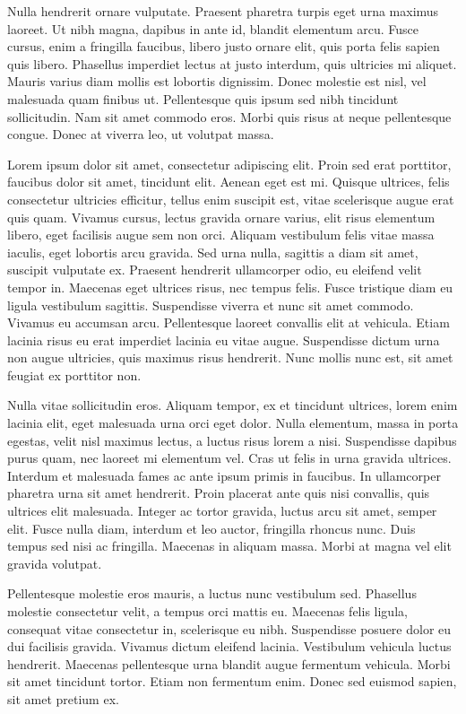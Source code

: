 Nulla hendrerit ornare vulputate. Praesent pharetra turpis eget urna maximus laoreet. Ut nibh magna, dapibus in ante id, blandit elementum arcu. Fusce cursus, enim a fringilla faucibus, libero justo ornare elit, quis porta felis sapien quis libero. Phasellus imperdiet lectus at justo interdum, quis ultricies mi aliquet. Mauris varius diam mollis est lobortis dignissim. Donec molestie est nisl, vel malesuada quam finibus ut. Pellentesque quis ipsum sed nibh tincidunt sollicitudin. Nam sit amet commodo eros. Morbi quis risus at neque pellentesque congue. Donec at viverra leo, ut volutpat massa. 




Lorem ipsum dolor sit amet, consectetur adipiscing elit. Proin sed erat porttitor, faucibus dolor sit amet, tincidunt elit. Aenean eget est mi. Quisque ultrices, felis consectetur ultricies efficitur, tellus enim suscipit est, vitae scelerisque augue erat quis quam. Vivamus cursus, lectus gravida ornare varius, elit risus elementum libero, eget facilisis augue sem non orci. Aliquam vestibulum felis vitae massa iaculis, eget lobortis arcu gravida. Sed urna nulla, sagittis a diam sit amet, suscipit vulputate ex. Praesent hendrerit ullamcorper odio, eu eleifend velit tempor in. Maecenas eget ultrices risus, nec tempus felis. Fusce tristique diam eu ligula vestibulum sagittis. Suspendisse viverra et nunc sit amet commodo. Vivamus eu accumsan arcu. Pellentesque laoreet convallis elit at vehicula. Etiam lacinia risus eu erat imperdiet lacinia eu vitae augue. Suspendisse dictum urna non augue ultricies, quis maximus risus hendrerit. Nunc mollis nunc est, sit amet feugiat ex porttitor non.

Nulla vitae sollicitudin eros. Aliquam tempor, ex et tincidunt ultrices, lorem enim lacinia elit, eget malesuada urna orci eget dolor. Nulla elementum, massa in porta egestas, velit nisl maximus lectus, a luctus risus lorem a nisi. Suspendisse dapibus purus quam, nec laoreet mi elementum vel. Cras ut felis in urna gravida ultrices. Interdum et malesuada fames ac ante ipsum primis in faucibus. In ullamcorper pharetra urna sit amet hendrerit. Proin placerat ante quis nisi convallis, quis ultrices elit malesuada. Integer ac tortor gravida, luctus arcu sit amet, semper elit. Fusce nulla diam, interdum et leo auctor, fringilla rhoncus nunc. Duis tempus sed nisi ac fringilla. Maecenas in aliquam massa. Morbi at magna vel elit gravida volutpat.

Pellentesque molestie eros mauris, a luctus nunc vestibulum sed. Phasellus molestie consectetur velit, a tempus orci mattis eu. Maecenas felis ligula, consequat vitae consectetur in, scelerisque eu nibh. Suspendisse posuere dolor eu dui facilisis gravida. Vivamus dictum eleifend lacinia. Vestibulum vehicula luctus hendrerit. Maecenas pellentesque urna blandit augue fermentum vehicula. Morbi sit amet tincidunt tortor. Etiam non fermentum enim. Donec sed euismod sapien, sit amet pretium ex.

